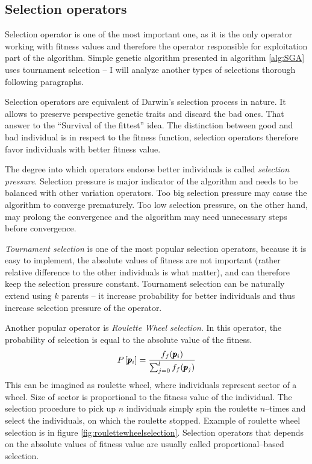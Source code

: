 \subsection{Selection operators}

Selection operator is one of the most important one, as it is the only operator working with fitness values and therefore the operator responsible for exploitation part of the algorithm. Simple genetic algorithm presented in algorithm \ref{alg:SGA} uses tournament selection -- I will analyze another types of selections thorough following paragraphs.

Selection operators are equivalent of Darwin's selection process in nature. It allows to preserve perspective genetic traits and discard the bad ones. That answer to the \enquote{Survival of the fittest} idea. The distinction between good and bad individual is in respect to the fitness function, selection operators therefore favor individuals with better fitness value.

The degree into which operators endorse better individuals is called \emph{selection pressure}. Selection pressure is major indicator of the algorithm and needs to be balanced with other variation operators. Too big selection pressure may cause the algorithm to converge prematurely. Too low selection pressure, on the other hand, may prolong the convergence and the algorithm may need unnecessary steps before convergence.

\emph{Tournament selection} is one of the most popular selection operators, because it is easy to implement, the absolute values of fitness are not important (rather relative difference to the other individuals is what matter), and can therefore keep the selection pressure constant. Tournament selection can be naturally extend using $k$ parents -- it increase probability for better individuals and thus increase selection pressure of the operator.

Another popular operator is \emph{Roulette Wheel selection}. In this operator, the probability of selection is equal to the absolute value of the fitness.
$$ P\left[\pmb{p}_i\right] = \frac{f_f(\pmb{p}_i)}{\sum_{j=0}^{l}f_f(\pmb{p}_j)} $$
This can be imagined as roulette wheel, where individuals represent sector of a wheel. Size of sector is proportional to the fitness value of the individual. The selection procedure to pick up $n$ individuals simply spin the roulette $n$--times and select the individuals, on which the roulette stopped. Example of roulette wheel selection is in figure \ref{fig:roulettewheelselection}. Selection operators that depends on the absolute values of fitness value are usually called proportional--based selection.

